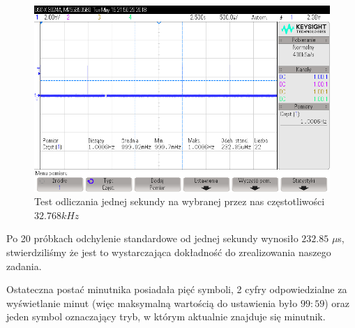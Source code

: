 \documentclass[fleqn]{article}
\begin{document}
\begin{figure}[H]
	\includegraphics[width=\textwidth]{scope_1.png}
	\caption{Test odliczania jednej sekundy na wybranej przez nas częstotliwości $32.768 kHz$}
\end{figure}

Po 20 próbkach odchylenie standardowe od jednej sekundy wynosiło $232.85$ $\mu$s, stwierdziliśmy że jest to wystarczająca dokładność do zrealizowania naszego zadania.

Ostateczna postać minutnika posiadała pięć symboli, 2 cyfry odpowiedzialne za wyświetlanie minut (więc maksymalną wartością do ustawienia było $99:59$) oraz jeden symbol oznaczający tryb, w którym aktualnie znajduje się minutnik.
\end{document}
